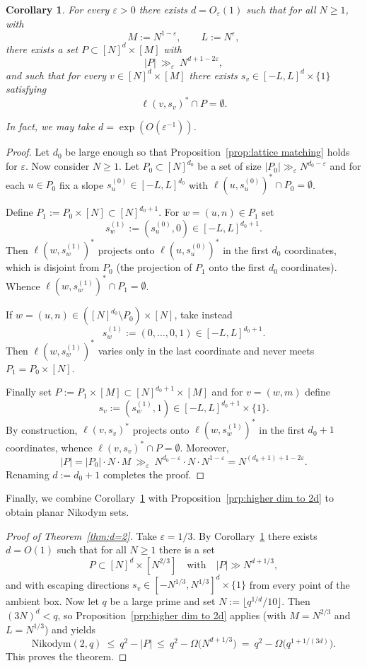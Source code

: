 \documentclass[12pt,reqno]{amsart}
\theoremstyle{plain}
\newtheorem{corollary}[theorem]{Corollary}
\theoremstyle{definition}
\newcommand{\Nik}{\mathrm{Nikodym}}
\newcommand{\1}{\mathbf{1}}
\begin{document}
\begin{corollary}\label{cor:lattice-nikodym}
For every $\varepsilon>0$ there exists $d=O_\varepsilon(1)$ such that for all $N\ge 1$, with
\[
M:=N^{1-\varepsilon},\qquad L:=N^\varepsilon,
\]
there exists a set $P\subset [N]^d\times [M]$ with
\[
  |P|\ \gg_\varepsilon\ N^{d+1-2\varepsilon},
\]
and such that for every $v\in [N]^d\times [M]$ there exists $s_v\in [-L,L]^d\times\{1\}$ satisfying
\[
  \ell(v,s_v)^\ast\cap P=\emptyset.
\]

In fact, we may take $d=\exp(O(\varepsilon^{-1}))$.
\end{corollary}

\begin{proof}
Let $d_0$ be large enough so that Proposition~\ref{prop:lattice matching} holds for $\varepsilon$. Now consider $N\ge 1$.
Let $P_0\subset [N]^{d_0}$ be a set of size $|P_0|\gg_\varepsilon N^{d_0-\varepsilon}$ and for each $u\in P_0$ fix a slope 
$s_u^{(0)}\in [ -L,L]^{d_0}$ with $\ell(u,s_u^{(0)})^\ast\cap P_0=\emptyset$.

Define $P_1:=P_0\times [N]\subset [N]^{d_0+1}$.  For $w=(u,n)\in P_1$ set
\[
s_w^{(1)}:=(s_u^{(0)},0)\in [-L,L]^{d_0+1}.
\]
Then $\ell(w,s_w^{(1)})^\ast$ projects onto $\ell(u,s_u^{(0)})^\ast$ in the first $d_0$ coordinates, which is disjoint from $P_0$ (the projection of $P_1$ onto the first $d_0$ coordinates). Whence
$\ell(w,s_w^{(1)})^\ast\cap P_1=\emptyset$.

If $w=(u,n)\in ([N]^{d_0}\setminus P_0)\times [N]$, take instead
\[
s_w^{(1)}:=(0,\dots,0,1)\in [-L,L]^{d_0+1}.
\]
Then $\ell(w,s_w^{(1)})^\ast$ varies only in the last coordinate and never meets $P_1=P_0\times[N]$.

Finally set $P:=P_1\times [M]\subset [N]^{d_0+1}\times[M]$ and for $v=(w,m)$ define
\[
s_v:=(s_{w}^{(1)},1)\in [-L,L]^{d_0+1}\times\{1\}.
\]
By construction, $\ell(v,s_v)^\ast$ projects onto $\ell(w,s_{w}^{(1)})^*$ in the first $d_0+1$ coordinates, whence $\ell(v,s_v)^*\cap P=\emptyset$.
Moreover,
\[
|P|=|P_0|\cdot N\cdot M\ \gg_\varepsilon\ N^{d_0-\varepsilon}\cdot N\cdot N^{1-\varepsilon}
= N^{(d_0+1)+1-2\varepsilon}.
\]
Renaming $d:=d_0+1$ completes the proof.
\end{proof}

Finally, we combine Corollary~\ref{cor:lattice-nikodym} with Proposition~\ref{prp:higher dim to 2d} to obtain planar Nikodym sets.

\begin{proof}[Proof of Theorem~\ref{thm:d=2}]
Take $\varepsilon=1/3$.  By Corollary~\ref{cor:lattice-nikodym} there exists $d=O(1)$ such that for all $N\ge 1$ there is
a set
\[
P\subset [N]^d\times [N^{2/3}]
\quad\text{with}\quad
|P|\gg N^{d+1/3},
\]
and with escaping directions $s_v\in[-N^{1/3},N^{1/3}]^d\times\{1\}$ from every point of the ambient box.
Now let $q$ be a large prime and set $N:=\lfloor q^{1/d}/10\rfloor$. Then $(3N)^d<q$, so Proposition~\ref{prp:higher dim to 2d}
applies (with $M=N^{2/3}$ and $L=N^{1/3}$) and yields
\[
\Nik(2,q)\ \le\ q^2-|P|
\ \le\ q^2-\Omega\!\bigl(N^{d+1/3}\bigr)
\ =\ q^2-\Omega\!\bigl(q^{1+1/(3d)}\bigr).
\]
This proves the theorem.
\end{proof}
\end{document}
